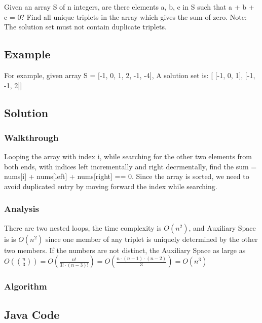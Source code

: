 \documentclass[]{book}
\begin{document}
Given an array S of n integers, are there elements a, b, c in S such that a + b + c = 0? Find all unique triplets in the array which
gives the sum of zero. Note: The solution set must not contain duplicate triplets.

\hypertarget{example-4}{%
\subsection{Example}\label{example-4}}

For example, given array S = {[}-1, 0, 1, 2, -1, -4{]},
A solution set is:
{[}
{[}-1, 0, 1{]},
{[}-1, -1, 2{]}{]}

\hypertarget{solution-4}{%
\subsection{Solution}\label{solution-4}}

\hypertarget{walkthrough-6}{%
\subsubsection{Walkthrough}\label{walkthrough-6}}

Looping the array with index i, while searching for the other two elements from both ends, with indices
left incrementally and right decrmentally, find the sum = nums{[}i{]} + nums{[}left{]} + nums{[}right{]} == 0. Since the array is
sorted, we need to avoid duplicated entry by moving forward the index while searching.

\hypertarget{analysis-6}{%
\subsubsection{Analysis}\label{analysis-6}}

There are two nested loops, the time complexity is \(O(n^2)\), and Auxiliary Space is is \(O(n^2)\) since one member of any
triplet is uniquely determined by the other two members. If the numbers are not distinct, the Auxiliary Space as large as
\(O(\binom{n}{3}) = O(\frac{n!}{3!\cdot (n-3)!}) = O(\frac{n\cdot (n-1)\cdot(n-2)}{3}) = O(n^3)\)

\hypertarget{algorithm-6}{%
\subsubsection{Algorithm}\label{algorithm-6}}

\hypertarget{java-code-4}{%
\subsection{Java Code}\label{java-code-4}}
\end{document}
